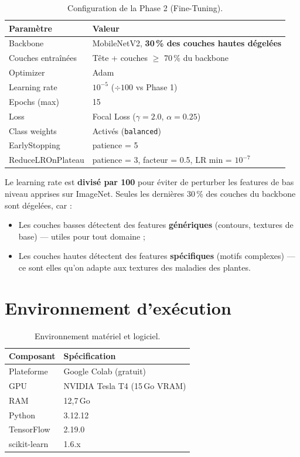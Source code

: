\documentclass[12pt, a4paper, twoside]{report}
\begin{document}
\begin{table}[H]
\centering
\caption{Configuration de la Phase 2 (Fine-Tuning).}
\label{tab:phase2-config}
\begin{tabular}{ll}
\toprule
\textbf{Paramètre}     & \textbf{Valeur} \\
\midrule
Backbone                & MobileNetV2, \textbf{30\,\% des couches hautes dégelées} \\
Couches entraînées      & Tête + couches $\geq$ 70\,\% du backbone \\
Optimizer               & Adam \\
Learning rate           & $10^{-5}$ ($\div 100$ vs Phase 1) \\
Epochs (max)            & 15 \\
Loss                    & Focal Loss ($\gamma=2.0$, $\alpha=0.25$) \\
Class weights           & Activés (\texttt{balanced}) \\
EarlyStopping           & patience = 5 \\
ReduceLROnPlateau       & patience = 3, facteur = 0.5, LR min = $10^{-7}$ \\
\bottomrule
\end{tabular}
\end{table}

Le learning rate est \textbf{divisé par 100} pour éviter de perturber les features de bas niveau apprises sur ImageNet. Seules les dernières 30\,\% des couches du backbone sont dégelées, car :
\begin{itemize}
    \item Les couches basses détectent des features \textbf{génériques} (contours, textures de base) — utiles pour tout domaine ;
    \item Les couches hautes détectent des features \textbf{spécifiques} (motifs complexes) — ce sont elles qu'on adapte aux textures des maladies des plantes.
\end{itemize}

\section{Environnement d'exécution}

\begin{table}[H]
\centering
\caption{Environnement matériel et logiciel.}
\label{tab:env}
\begin{tabular}{ll}
\toprule
\textbf{Composant}      & \textbf{Spécification} \\
\midrule
Plateforme               & Google Colab (gratuit) \\
GPU                      & NVIDIA Tesla T4 (15\,Go VRAM) \\
RAM                      & 12,7\,Go \\
Python                   & 3.12.12 \\
TensorFlow               & 2.19.0 \\
scikit-learn             & 1.6.x \\
\bottomrule
\end{tabular}
\end{table}
\end{document}
